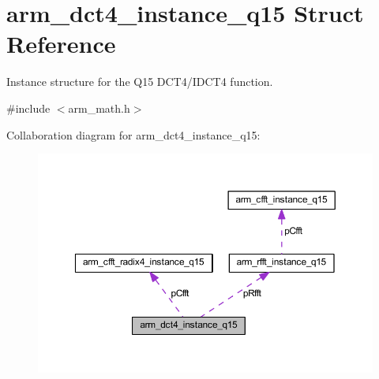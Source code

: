 \hypertarget{structarm__dct4__instance__q15}{}\section{arm\+\_\+dct4\+\_\+instance\+\_\+q15 Struct Reference}
\label{structarm__dct4__instance__q15}


Instance structure for the Q15 D\+C\+T4/\+I\+D\+C\+T4 function.  




{\ttfamily \#include $<$arm\+\_\+math.\+h$>$}



Collaboration diagram for arm\+\_\+dct4\+\_\+instance\+\_\+q15\+:
\nopagebreak
\begin{figure}[H]
\begin{center}
\leavevmode
\includegraphics[width=350pt]{structarm__dct4__instance__q15__coll__graph}
\end{center}
\end{figure}
